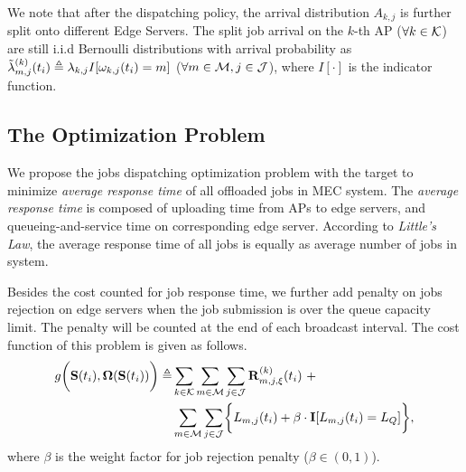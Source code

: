 We note that after the dispatching policy, the arrival distribution $A_{k,j}$ is further split onto different Edge Servers.
The split job arrival on the $k$-th AP ($\forall k\in\mathcal{K}$) are still i.i.d Bernoulli distributions with arrival probability as 
$\tilde{\lambda}^{(k)}_{m,j}(t_{i}) \triangleq \lambda_{k,j} I[\omega_{k,j}(t_i) = m]$ ($\forall m\in\mathcal{M}, j\in\mathcal{J}$), where $I[\cdot]$ is the indicator function.

\subsection{The Optimization Problem}
We propose the jobs dispatching optimization problem with the target to minimize \emph{average response time} of all offloaded jobs in MEC system.
The \emph{average response time} is composed of uploading time from APs to edge servers, and queueing-and-service time on corresponding edge server. According to \emph{Little's Law}, the average response time of all jobs is equally as average number of jobs in system.
        
Besides the cost counted for job response time, we further add penalty on jobs rejection on edge servers when the job submission is over the queue capacity limit. The penalty will be counted at the end of each broadcast interval.
The cost function of this problem is given as follows.
\begin{align}
    g\Paren{\Stat(t_{i}), \Policy(\Stat(t_{i}))} \define
        &\sum_{k\in\apSet} \sum_{m\in\esSet} \sum_{j\in\jSpace} \vec{R}^{(k)}_{m,j,\xi}(t_{i})~+
        \nonumber\\
        &\sum_{m\in\esSet} \sum_{j\in\jSpace} \Brace{L_{m,j}(t_{i}) + \beta \cdot \mat{I}[L_{m,j}(t_{i})=L_Q]},
\end{align}
where $\beta$ is the weight factor for job rejection penalty ($\beta \in (0,1)$).
        
